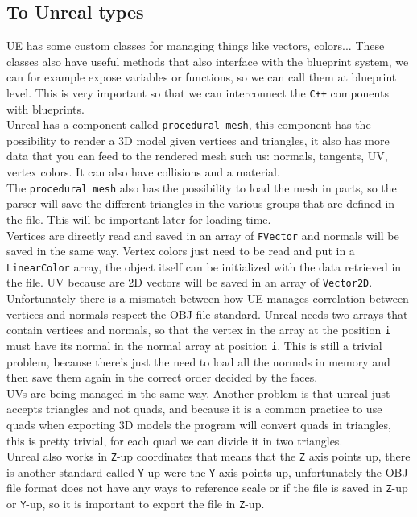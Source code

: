 \subsection{To Unreal types}
\noindent
\ac{UE} has some custom classes for managing things like vectors, colors... These classes also have useful methods that also interface with the blueprint system, we can for example expose variables or functions, so we can call them at blueprint level.
This is very important so that we can interconnect the \texttt{C++} components with blueprints.\\
Unreal has a component called \texttt{procedural mesh}, this component has the possibility to render a 3D model given vertices and triangles, it also has more data that you can feed to the rendered mesh such  us: normals, tangents, UV, vertex colors.
It can also have collisions and a material.\\
The \texttt{procedural mesh} also has the possibility to load the mesh in parts, so the parser will save the different triangles in the various groups that are defined in the file.
This will be important later for loading time.\\
Vertices are directly read and saved in an array of \texttt{FVector} and normals will be saved in the same way.
Vertex colors just need to be read and put in a \texttt{LinearColor} array, the object itself can be initialized with the data retrieved in the file.
UV because are 2D vectors will be saved in an array of \texttt{Vector2D}.
Unfortunately there is a mismatch between how \ac{UE} manages correlation between vertices and normals respect the OBJ file standard.
Unreal needs two arrays that contain vertices and normals, so that the vertex in the array at the position \texttt{i} must have its normal in the normal array at position \texttt{i}. 
This is still a trivial problem, because there's just the need to load all the normals in memory and then save them again in the correct order decided by the faces.\\
UVs are being managed in the same way.
Another problem is that unreal just accepts triangles and not quads, and because it is a common practice to use quads when exporting 3D models the program will convert quads in triangles, this is pretty trivial, for each quad we can divide it in two triangles.\\
Unreal also works in \texttt{Z}-up coordinates that means that the \texttt{Z} axis points up, there is another standard called \texttt{Y}-up were the \texttt{Y} axis points up, unfortunately the OBJ file format does not have any ways to reference scale or if the file is saved in \texttt{Z}-up or \texttt{Y}-up,
so it is important to export the file in \texttt{Z}-up.\\


